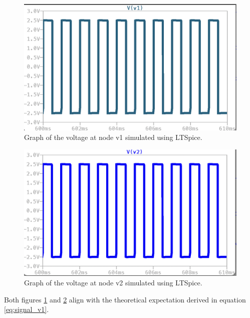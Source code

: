 \documentclass[lettersize,journal]{IEEEtran}
\begin{document}
\begin{figure}
    \centering
    \includegraphics[width=\linewidth]{images/week1_v1.png}
    \caption{Graph of the voltage at node v1 simulated using LTSpice.}
    \label{fig:v_1-sim}
\end{figure}

\begin{figure}
    \centering
    \includegraphics[width=\linewidth]{images/week1_v2.png}
    \caption{Graph of the voltage at node v2 simulated using LTSpice.}
    \label{fig:v2-sim}
\end{figure}

Both figures \ref{fig:v_1-sim} and \ref{fig:v2-sim} align with the theoretical expectation derived in equation \ref{eq:signal_v1}.
\end{document}
